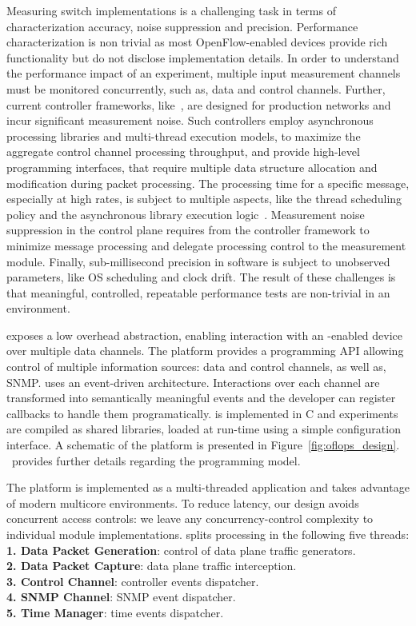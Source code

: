 Measuring \of switch implementations is a challenging task in terms of
characterization accuracy, noise suppression and precision.  Performance
characterization is non trivial as most OpenFlow-enabled devices provide rich
functionality but do not disclose implementation details. In order to understand
the performance impact of an experiment, multiple input measurement channels
must be monitored concurrently, such as, data and control channels. Further,
current controller frameworks, like~, are designed for
production networks and incur significant measurement noise. Such controllers
employ asynchronous processing libraries and multi-thread execution models, to
maximize the aggregate control channel processing throughput, and provide
high-level programming interfaces, that require multiple data structure
allocation and modification during packet processing.  The processing time for a
specific \of message, especially at high rates, is subject to multiple aspects,
like the thread scheduling policy and the asynchronous library execution
logic~.  Measurement noise suppression in the control plane
requires from the controller framework to minimize message processing and
delegate processing control to the measurement module.  Finally, sub-millisecond
precision in software is subject to unobserved parameters, like OS scheduling
and clock drift. The result of these challenges is that meaningful, controlled,
repeatable performance tests are non-trivial in an \of environment.

\oflops exposes a low overhead abstraction, enabling interaction with
an \of-enabled device over multiple data channels.  The platform provides a
programming API allowing control of multiple information sources: data and
control channels, as well as, SNMP\@.  \oflops uses an event-driven
architecture. Interactions over each channel are transformed into semantically
meaningful events and the developer can register callbacks to handle them
programatically.  \oflops is implemented in C and experiments are compiled as
shared libraries, loaded at run-time using a simple configuration interface.  A
schematic of the platform is presented in Figure~\ref{fig:oflops_design}.
~provides further details regarding the \oflops programming
model.

The platform is implemented as a multi-threaded application and takes
advantage of modern multicore environments. To reduce latency, our design
avoids concurrent access controls: we leave any concurrency-control complexity 
to individual module implementations. \oflops splits processing in the following
five threads:\\
\textbf{1. Data Packet Generation}: control of data plane traffic generators.\\
\textbf{2. Data Packet Capture}: data plane traffic interception.\\
\textbf{3. Control Channel}: controller events dispatcher.\\
\textbf{4. SNMP Channel}: SNMP event dispatcher.\\
\textbf{5. Time Manager}: time events dispatcher.

